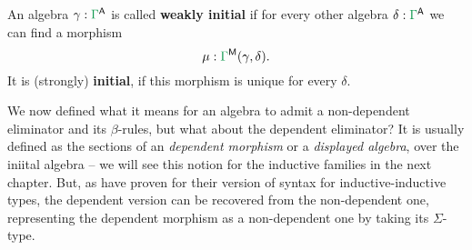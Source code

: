 \begin{defn}
An algebra $\gamma : \grm{\Gamma}^\CC$ is called \textbf{weakly initial} if
for every other algebra $\delta : \grm{\Gamma}^\CC$ we can find a morphism
\begin{equation*}
\mu : \grm{\Gamma}^\MM(\gamma, \delta) \text{.}
\end{equation*}
It is (strongly) \textbf{initial}, if this morphism is unique for every $\delta$.
\end{defn}

\begin{remark}
We now defined what it means for an algebra to admit a non-dependent eliminator
and its $\beta$-rules, but what about the dependent eliminator?
It is usually defined as the sections of an \emph{dependent morphism}
or a \emph{displayed algebra},
over the iniital algebra -- we will see this notion for the inductive families in the
next chapter.
But, as \citet{constructingqiits} have proven for their version of syntax for inductive-inductive
types, the dependent version can be recovered from the non-dependent one,
representing the dependent morphism as a non-dependent one by
taking its $\Sigma$-type.
\end{remark}















